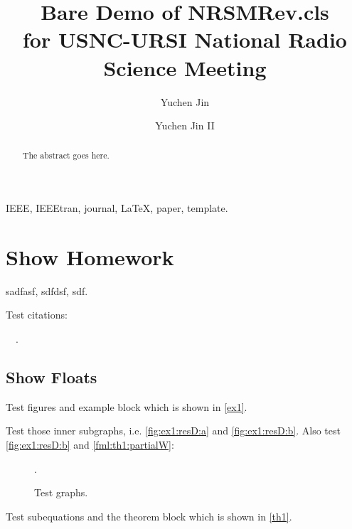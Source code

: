 \documentclass[color,hyper]{NRSMRev}
\title{Bare Demo of NRSMRev.cls\\ for USNC-URSI National Radio Science Meeting}
\author[org1]{Yuchen Jin}
\author[org1]{Yuchen Jin II}
\begin{document}
\maketitle

\begin{abstract}
  The abstract goes here.
\end{abstract}

\begin{IEEEkeywords}
  IEEE, IEEEtran, journal, \LaTeX, paper, template.
\end{IEEEkeywords}

\section{Show Homework}
sadfasf, sdfdsf, sdf.

Test citations:

\cite{Zeiler5539957}~\cite{Yang6175956}~\cite{Dong7115171}.

\subsection{Show Floats}

Test figures and example block which is shown in \autoref{ex1}.

\begin{example} \label{ex1}
  Test those inner subgraphs, i.e. \autoref{fig:ex1:resD:a} and \autoref{fig:ex1:resD:b}. Also test \ref{fig:ex1:resD:b} and \eqref{fml:th1:partialW}:
  
  \begin{figure}[H] \label{fig:ex1:resD}
		\centering
		\begin{minipage}[b]{0.48\columnwidth}
			\centering
		\end{minipage}
		\begin{minipage}[b]{0.48\columnwidth}
			\centering
		\end{minipage}
		\DeclareGraphicsExtensions.
		\caption{Test graphs.}
	\end{figure}
	
	\qED
	
\end{example}

Test subequations and the theorem block which is shown in \autoref{th1}.
\end{document}
